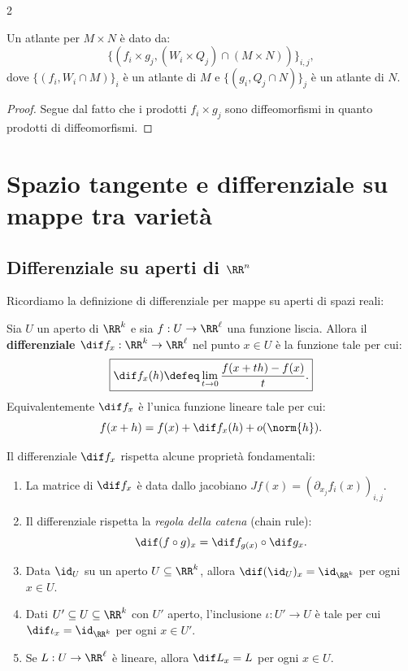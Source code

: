 \begin{multicols*}{2}
\begin{proposition}
        Un atlante per $M \times N$ è dato da:
        \[ \{(f_i \times g_j, (W_i \times Q_j) \cap (M \times N))\}_{i, j}, \]
        dove $\{(f_i, W_i \cap M)\}_i$ è un atlante di $M$
        e $\{(g_i, Q_j \cap N)\}_j$ è un atlante di $N$.
    \end{proposition}

    \begin{proof}
        Segue dal fatto che i prodotti $f_i \times g_j$ sono diffeomorfismi in quanto prodotti
        di diffeomorfismi.
    \end{proof}

    \section{Spazio tangente e differenziale su mappe tra varietà}

    \subsection{Differenziale su aperti di \texorpdfstring{$\RR^n$}{ℝⁿ}}

    Ricordiamo la definizione di differenziale per mappe su aperti di spazi reali:

    \begin{definition}
        Sia $U$ un aperto di $\RR^k$ e sia $f : U \to \RR^\ell$ una funzione liscia.
        Allora il \textbf{differenziale $\dif f_x : \RR^k \to \RR^\ell$} nel
        punto $x \in U$ è la funzione tale per cui:
        \[
            \boxed{\dif f_x(h) \defeq \lim_{t \to 0} \frac{f(x+th) - f(x)}{t}.}
        \]
        Equivalentemente $\dif f_x$ è l'unica funzione lineare tale per cui:
        \[
            f(x+h) = f(x) + \dif f_x(h) + o(\norm{h}).
        \]
    \end{definition}

    \begin{remark}
        Il differenziale $\dif f_x$ rispetta alcune proprietà fondamentali:
        \begin{enumerate}[(i.)]
            \item La matrice di $\dif f_x$ è data dallo jacobiano $Jf(x) = (\partial_{x_j} f_i(x))_{i, j}$.
            \item Il differenziale rispetta la \textit{regola della catena} (chain rule):
                  \[ \dif(f \circ g)_x = \dif f_{g(x)} \circ \dif g_x. \]
            \item Data $\id_U$ su un aperto $U \subseteq \RR^k$, allora $\dif (\id_U)_x = \id_{\RR^k}$ per ogni $x \in U$.
            \item Dati $U' \subseteq U \subseteq \RR^k$ con $U'$ aperto, l'inclusione $\iota : U' \to U$ è tale per cui
                  $\dif \iota_x = \id_{\RR^k}$ per ogni $x \in U'$.
            \item Se $L : U \to \RR^\ell$ è lineare, allora $\dif L_x = L$ per ogni $x \in U$.
        \end{enumerate}
    \end{remark}


\end{multicols*}
